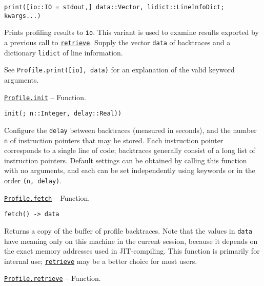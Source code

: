 \begin{adjustwidth}{2em}{0pt}
\begin{itemize}
\end{itemize}



\begin{lstlisting}
print([io::IO = stdout,] data::Vector, lidict::LineInfoDict; kwargs...)
\end{lstlisting}

Prints profiling results to \texttt{io}. This variant is used to examine results exported by a previous call to \hyperlink{10202508103131430980}{\texttt{retrieve}}. Supply the vector \texttt{data} of backtraces and a dictionary \texttt{lidict} of line information.

See \texttt{Profile.print([io], data)} for an explanation of the valid keyword arguments.



\end{adjustwidth}
\hypertarget{11074776852943687092}{} 
\hyperlink{11074776852943687092}{\texttt{Profile.init}}  -- {Function.}

\begin{adjustwidth}{2em}{0pt}


\begin{verbatim}
init(; n::Integer, delay::Real))
\end{verbatim}

Configure the \texttt{delay} between backtraces (measured in seconds), and the number \texttt{n} of instruction pointers that may be stored. Each instruction pointer corresponds to a single line of code; backtraces generally consist of a long list of instruction pointers. Default settings can be obtained by calling this function with no arguments, and each can be set independently using keywords or in the order \texttt{(n, delay)}.



\end{adjustwidth}
\hypertarget{3578108280181558112}{} 
\hyperlink{3578108280181558112}{\texttt{Profile.fetch}}  -- {Function.}

\begin{adjustwidth}{2em}{0pt}


\begin{verbatim}
fetch() -> data
\end{verbatim}

Returns a copy of the buffer of profile backtraces. Note that the values in \texttt{data} have meaning only on this machine in the current session, because it depends on the exact memory addresses used in JIT-compiling. This function is primarily for internal use; \hyperlink{10202508103131430980}{\texttt{retrieve}} may be a better choice for most users.



\end{adjustwidth}
\hypertarget{10202508103131430980}{} 
\hyperlink{10202508103131430980}{\texttt{Profile.retrieve}}  -- {Function.}

